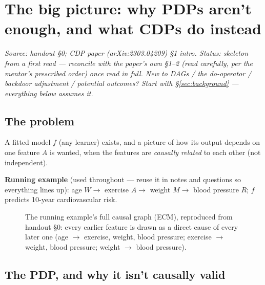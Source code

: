 \section{The big picture: why PDPs aren't enough, and what CDPs do instead}
\label{sec:bigpicture}

\emph{Source: handout \S0; CDP paper (arXiv:2303.04209) \S1 intro. Status:
skeleton from a first read --- reconcile with the paper's own \S1--2 (read
carefully, per the mentor's prescribed order) once read in full. New to
DAGs / the do-operator / backdoor adjustment / potential outcomes? Start
with \S\ref{sec:background} --- everything below assumes it.}

\subsection{The problem}

A fitted model $f$ (any learner) exists, and a picture of how its output
depends on one feature $A$ is wanted, when the features are
\emph{causally related} to each other (not independent).

\textbf{Running example} (used throughout --- reuse it in notes and
questions so everything lines up): age $W \to$ exercise $A \to$ weight
$M \to$ blood pressure $R$; $f$ predicts 10-year cardiovascular risk.

\begin{figure}[h]
\centering
{}
\caption{The running example's full causal graph (ECM), reproduced from
handout \S0: every earlier feature is drawn as a direct cause of every later
one (age $\to$ exercise, weight, blood pressure; exercise $\to$ weight,
blood pressure; weight $\to$ blood pressure).}
\label{fig:ecm-base}
\end{figure}

\subsection{The PDP, and why it isn't causally valid}

